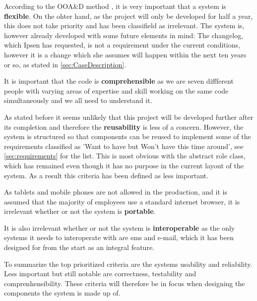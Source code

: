 \documentclass[../../master.tex]{subfiles}
\begin{document}
According to the OOA\&D method \citep[p.~182]{Rod-Aalborg}, it is very important that a system is \textbf{flexible}.
On the ohter hand, as the project will only be developed for half a year, this does not take priority and has been classifield as irrelevant.
The system is, however already developed with some future elements in mind: The changelog, which Ipsen has requested, is not a requirement under the current conditions, however it is a change which she assumes will happen within the next ten years or so, as stated in \cref{sec:CaseDescription}.

It is important that the code is \textbf{comprehensible} as we are seven diffferent people with varying areas of expertise and skill working on the same code simultaneously and we all need to understand it.

As stated before it seems unlikely that this project will be developed further after its completion and therefore the \textbf{reusability} is less of a concern.
However, the system is structured so that components can be reused to implement some of the requirements classified as 'Want to have but Won't have this time around', see \cref{sec:requirements} for the list.
This is most obvious with the abstract role class, which has remained even though it has no purpose in the current layout of the system.
As a result this criteria has been defined as less important.

As tablets and mobile phones are not allowed in the production, and it is assumed that the majority of employees use a standard internet browser, it is irrelevant whether or not the system is \textbf{portable}.

It is also irrelevant whether or not the system is \textbf{interoperable} as the only systems it needs to interoperate with are sms and e-mail, which it has been designed for from the start as an integral feature.

To summarize the top prioritized criteria are the systems usability and reliability.
Less important but still notable are correctness, testability and comprenhensibility.
These criteria will therefore be in focus when designing the components the system is made up of.
\end{document}
